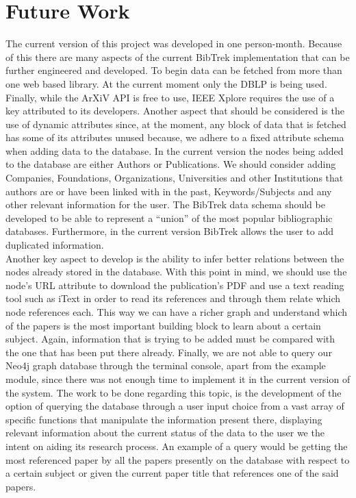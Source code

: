 \documentclass[twocolumn]{article}
\begin{document}
\section{Future Work}
The current version of this project was developed in one person-month. Because of this there are many aspects of the current BibTrek implementation that can be further engineered and developed. To begin data can be fetched from more than one web based library. At the current moment only the DBLP is being used. Finally, while the ArXiV API is free to use, IEEE Xplore requires the use of a key attributed to its developers. Another aspect that should be considered is the use of dynamic attributes since, at the moment, any block of data that is fetched has some of its attributes unused because, we adhere to a fixed attribute schema when adding data to the database. In the current version the nodes being added to the database are either Authors or Publications. We should consider adding Companies, Foundations, Organizations, Universities and other Institutions that authors are or have been linked with in the past, Keywords/Subjects and any other relevant information for the user. The BibTrek data schema should be developed to be able to represent a ``union'' of the most popular bibliographic databases. Furthermore, in the current version BibTrek allows the user to add duplicated information. 
\\[1\baselineskip]
Another key aspect to develop is the ability to infer better relations between the nodes already stored in the database. With this point in mind, we should use the node's URL attribute to download the publication's PDF and use a text reading tool such as iText in order to read its references and through them relate which node references each. This way we can have a richer graph and understand which of the papers is the most important building block to learn about a certain subject. Again, information that is trying to be added must be compared with the one that has been put there already. Finally, we are not able to query our Neo4j graph database through the terminal console, apart from the example module, since there was not enough time to implement it in the current version of the system. The work to be done regarding this topic, is the development of the option of querying the database through a user input choice from a vast array of specific functions that manipulate the information present there, displaying relevant information about the current status of the data to the user we the intent on aiding its research process. An example of a query would be getting the most referenced paper by all the papers presently on the database with respect to a certain subject or given the current paper title that references one of the said papers.
\end{document}
